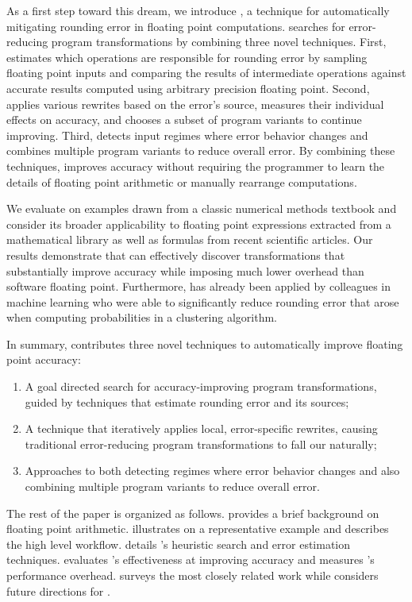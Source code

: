 \documentclass[paper.tex]{subfiles}
\begin{document}
As a first step toward this dream, we introduce \casio,
  a technique for automatically mitigating rounding error
  in floating point computations.
\casio searches for error-reducing program
transformations by combining three novel techniques.  First, \casio
estimates which operations are responsible for rounding error by
sampling floating point inputs and comparing the results of
intermediate operations against accurate results computed using
arbitrary precision floating point.  Second, \casio applies various
rewrites based on the error's source, measures their individual
effects on accuracy, and chooses a subset of program variants to
continue improving.  Third, \casio detects input regimes where error
behavior changes and combines multiple program variants to reduce
overall error.  By combining these techniques, \casio improves
accuracy without requiring the programmer to learn the details of
floating point arithmetic or manually rearrange computations.

We evaluate \casio on examples drawn from a classic numerical methods
textbook and consider its broader applicability to floating point
expressions extracted from a mathematical library as well as formulas
from recent scientific articles.  Our results demonstrate that \casio
can effectively discover transformations that substantially improve
accuracy while imposing much lower overhead than software floating
point.  Furthermore, \casio has already been applied by colleagues in
machine learning who were able to significantly reduce rounding error
that arose when computing probabilities in a clustering algorithm.

In summary, \casio contributes three novel techniques to automatically
improve floating point accuracy:
\begin{enumerate}
\item A goal directed search for accuracy-improving program
  transformations, guided by techniques that estimate rounding error
  and its sources;
\item A technique that iteratively applies local, error-specific
  rewrites, causing traditional error-reducing program transformations
  to fall our naturally;
\item Approaches to both detecting regimes where error behavior
  changes and also combining multiple program variants to reduce
  overall error.
\end{enumerate}

The rest of the paper is organized as follows.  
provides a brief background on floating point arithmetic.
 illustrates \casio on a representative example and
describes the high level \casio workflow.  
details \casio's heuristic search and error estimation techniques.
 evaluates \casio's effectiveness at improving
accuracy and measures \casio's performance overhead.
 surveys the most closely related work while
 considers future directions for \casio.
\end{document}
